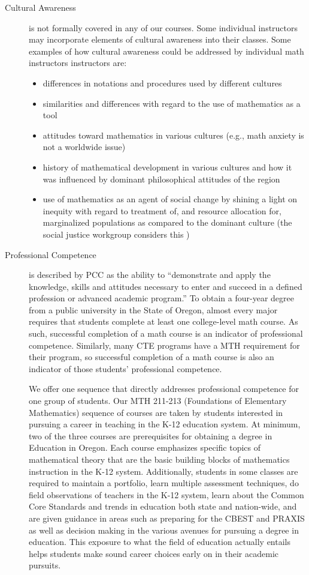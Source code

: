 \begin{description}
\item[Cultural Awareness] is not formally covered in any of our courses.  Some individual instructors may incorporate elements of cultural awareness into their classes.  Some examples of how cultural awareness could be addressed by individual math instructors instructors are: 
\begin{itemize}
\item differences in notations and procedures used by different cultures
\item similarities and differences with regard to the use of mathematics as a tool 
\item attitudes toward mathematics in various cultures (e.g., math anxiety is not a worldwide issue) 
\item history of mathematical  development in various cultures and how it was influenced by dominant philosophical attitudes of the region
\item use of mathematics as an agent of social change by shining a light on inequity with regard to treatment of, and resource allocation for, marginalized populations as compared to the dominant culture (the social justice workgroup considers this )
\end{itemize}

\item[Professional Competence] is described by PCC as the ability to ``demonstrate and apply the knowledge, skills and attitudes necessary to enter and succeed in a defined profession or advanced academic program.'' To obtain a four-year degree from a public university in the State of Oregon, almost every major requires that students complete at least one college-level math course.  As such, successful completion of a math course is an indicator of professional competence.  Similarly, many CTE programs have a MTH requirement for their program, so successful completion of a math course is also an indicator of those students' professional competence. 

We offer one sequence that directly addresses professional competence for one group of students.  Our  MTH 211-213 (Foundations of Elementary Mathematics) sequence of courses are taken by students interested in pursuing a career in teaching in the K-12 education system.  At minimum, two of the three courses are prerequisites for obtaining a degree in Education in Oregon.  Each course emphasizes specific topics of mathematical theory that are the basic building blocks of mathematics instruction in the K-12 system.  Additionally, students in some classes are required to maintain a portfolio, learn multiple assessment techniques, do field observations of teachers in the K-12 system, learn about the Common Core Standards and trends in education both state and nation-wide, and are given guidance in areas such as preparing for the CBEST and PRAXIS as well as decision making in the various avenues for pursuing a degree in education.  This exposure to what the field of education actually entails  helps students make sound career choices early on in their academic pursuits.


\end{description}
